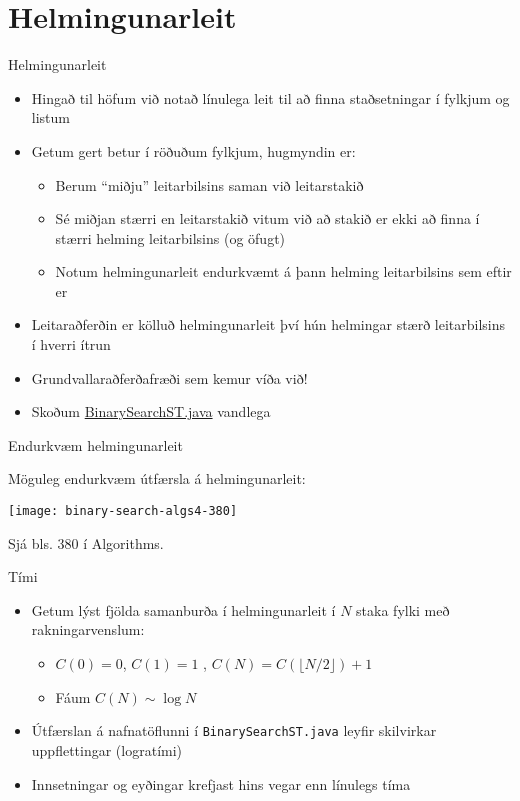 \documentclass{beamer}
\begin{document}
\section{Helmingunarleit}

\begin{frame}{Helmingunarleit}
\begin{itemize}
 \item Hingað til höfum við notað línulega leit til að finna staðsetningar í fylkjum og listum
 \item Getum gert betur í röðuðum fylkjum, hugmyndin er:
 \begin{itemize}
  \item Berum ``miðju'' leitarbilsins saman við leitarstakið
  \item Sé miðjan stærri en leitarstakið vitum við að stakið er ekki að finna í stærri helming leitarbilsins (og öfugt)
  \item Notum helmingunarleit endurkvæmt á þann helming leitarbilsins sem eftir er
 \end{itemize}
 \item Leitaraðferðin er kölluð helmingunarleit  því hún helmingar stærð leitarbilsins í hverri ítrun
 \item Grundvallaraðferðafræði sem kemur víða við!
 \item Skoðum \href{http://algs4.cs.princeton.edu/code/edu/princeton/cs/algs4/BinarySearchST.java.html}{BinarySearchST.java} vandlega
\end{itemize}
\end{frame}

\begin{frame}{Endurkvæm helmingunarleit}
\begin{center}
Möguleg endurkvæm útfærsla á helmingunarleit:

\texttt{[image: binary-search-algs4-380]}
\end{center}
Sjá bls. 380 í Algorithms.
\end{frame}


\begin{frame}{Tími}
\begin{itemize}
 \item Getum lýst fjölda samanburða í helmingunarleit í $N$ staka fylki með rakningarvenslum:
 \begin{itemize}
  \item $C(0) = 0$, $C(1) = 1$ , $C(N) = C(\lfloor N/2 \rfloor)+1$
  \item Fáum $C(N) \sim \log N$
 \end{itemize}
 \item Útfærslan á nafnatöflunni í \texttt{BinarySearchST.java} leyfir skilvirkar uppflettingar (logratími)
 \item Innsetningar og eyðingar krefjast hins vegar enn línulegs tíma
\end{itemize}
\end{frame}
\end{document}
